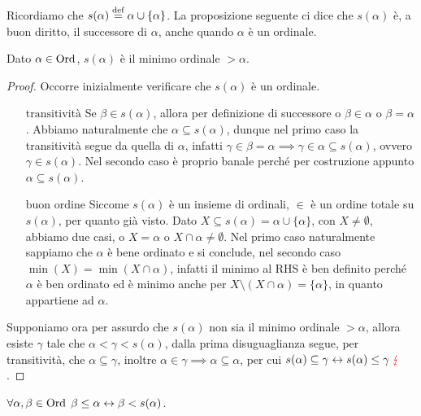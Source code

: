 Ricordiamo che $s(\alpha) \overset{\text{def}}{=} \alpha \cup \{\alpha\}$. La proposizione seguente ci dice che $s(\alpha)$ è, a buon diritto, il successore di $\alpha$, anche quando $\alpha$
è un ordinale.

\begin{proposition}
	Dato $\alpha \in \operatorname{Ord}$, $s(\alpha)$ è il minimo ordinale $> \alpha$.
\end{proposition}

\begin{proof}
	Occorre inizialmente verificare che $s(\alpha)$ è un ordinale.
	\begin{itemize}
		\item[$\boxed{\text{transitività}}$] Se $\beta \in s(\alpha)$, allora per definizione di successore o $\beta \in \alpha$ o $\beta = \alpha$. Abbiamo naturalmente che $\alpha \subseteq s(\alpha)$,
		dunque nel primo caso la transitività segue da quella di $\alpha$, infatti $\gamma \in \beta = \alpha \implies \gamma \in \alpha \subseteq s(\alpha)$, ovvero $\gamma \in s(\alpha)$.
		Nel secondo caso è proprio banale perché per costruzione appunto $\alpha \subseteq s(\alpha)$.
		\item[$\boxed{\text{buon ordine}}$] Siccome $s(\alpha)$ è un insieme di ordinali, $\in$ è un ordine totale su $s(\alpha)$, per quanto già visto. Dato $X \subseteq s(\alpha) = \alpha \cup \{\alpha\}$, con $X \ne \emptyset$,
		abbiamo due casi, o $X = \alpha$ o $X \cap \alpha \ne \emptyset$. Nel primo caso naturalmente sappiamo che $\alpha$ è bene ordinato e si conclude, nel secondo caso $\min(X) = \min(X \cap \alpha)$,
		infatti il minimo al RHS è ben definito perché $\alpha$ è ben ordinato ed è minimo anche per $X \setminus (X \cap \alpha) = \{\alpha\}$, in quanto appartiene ad $\alpha$.
	\end{itemize}
	Supponiamo ora per assurdo che $s(\alpha)$ non sia il minimo ordinale $> \alpha$, allora esiste $\gamma$ tale che $\alpha < \gamma < s(\alpha)$, dalla prima disuguaglianza segue, per transitività, che $\alpha \subseteq \gamma$,
	inoltre $\alpha \in \gamma \implies {\alpha} \subseteq \alpha$, per cui $s(\alpha) \subseteq \gamma \leftrightarrow s(\alpha) \leq \gamma \; \textcolor{red}{\lightning}$.
\end{proof}

\begin{corollary}
	$\forall \alpha,\beta \in\operatorname{Ord} \; \beta \leq \alpha \leftrightarrow \beta < s(\alpha)$.
\end{corollary}

